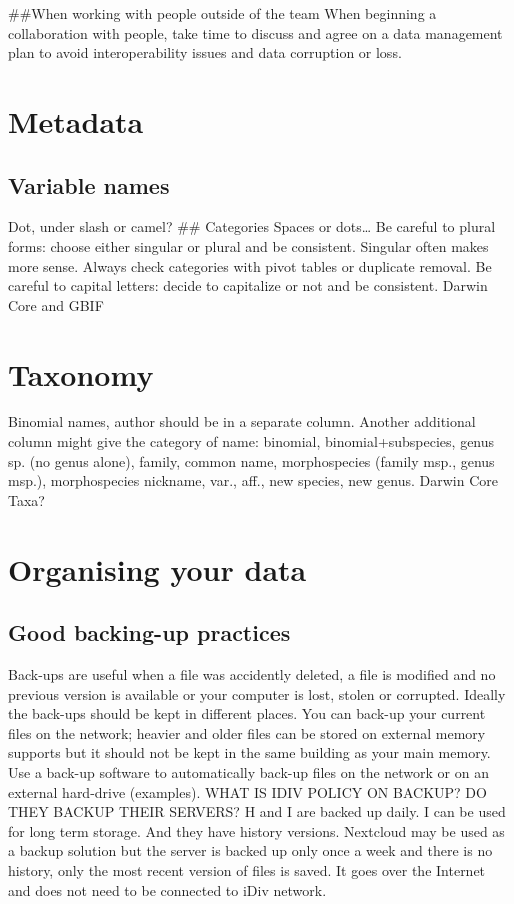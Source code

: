 \documentclass[
]{book}
\begin{document}
\#\#When working with people outside of the team
When beginning a collaboration with people, take time to discuss and agree on a data management plan to avoid interoperability issues and data corruption or loss.

\hypertarget{metadata}{%
\chapter{Metadata}\label{metadata}}

\hypertarget{variable-names}{%
\section{Variable names}\label{variable-names}}

Dot, under slash or camel?
\#\# Categories
Spaces or dots\ldots{}
Be careful to plural forms: choose either singular or plural and be consistent. Singular often makes more sense. Always check categories with pivot tables or duplicate removal.
Be careful to capital letters: decide to capitalize or not and be consistent.
Darwin Core and GBIF

\hypertarget{taxonomy}{%
\chapter{Taxonomy}\label{taxonomy}}

Binomial names, author should be in a separate column. Another additional column might give the category of name: binomial, binomial+subspecies, genus sp. (no genus alone), family, common name, morphospecies (family msp., genus msp.), morphospecies nickname, var., aff., new species, new genus.
Darwin Core Taxa?

\hypertarget{organising-your-data}{%
\chapter{Organising your data}\label{organising-your-data}}

\hypertarget{good-backing-up-practices}{%
\section{Good backing-up practices}\label{good-backing-up-practices}}

Back-ups are useful when a file was accidently deleted, a file is modified and no previous version is available or your computer is lost, stolen or corrupted. Ideally the back-ups should be kept in different places. You can back-up your current files on the network; heavier and older files can be stored on external memory supports but it should not be kept in the same building as your main memory. Use a back-up software to automatically back-up files on the network or on an external hard-drive (examples). WHAT IS IDIV POLICY ON BACKUP? DO THEY BACKUP THEIR SERVERS?
H and I are backed up daily. I can be used for long term storage. And they have history versions.
Nextcloud may be used as a backup solution but the server is backed up only once a week and there is no history, only the most recent version of files is saved. It goes over the Internet and does not need to be connected to iDiv network.
\end{document}
